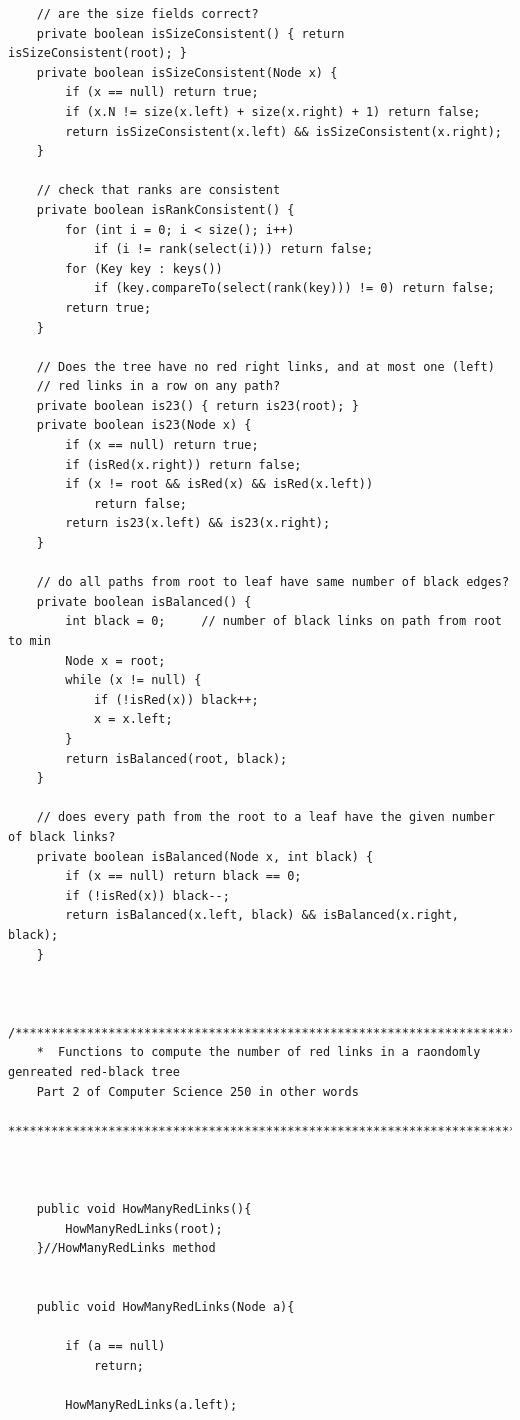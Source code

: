 \documentclass{article}
\begin{document}
\begin{lstlisting}
    // are the size fields correct?
    private boolean isSizeConsistent() { return isSizeConsistent(root); }
    private boolean isSizeConsistent(Node x) {
        if (x == null) return true;
        if (x.N != size(x.left) + size(x.right) + 1) return false;
        return isSizeConsistent(x.left) && isSizeConsistent(x.right);
    } 

    // check that ranks are consistent
    private boolean isRankConsistent() {
        for (int i = 0; i < size(); i++)
            if (i != rank(select(i))) return false;
        for (Key key : keys())
            if (key.compareTo(select(rank(key))) != 0) return false;
        return true;
    }

    // Does the tree have no red right links, and at most one (left)
    // red links in a row on any path?
    private boolean is23() { return is23(root); }
    private boolean is23(Node x) {
        if (x == null) return true;
        if (isRed(x.right)) return false;
        if (x != root && isRed(x) && isRed(x.left))
            return false;
        return is23(x.left) && is23(x.right);
    } 

    // do all paths from root to leaf have same number of black edges?
    private boolean isBalanced() { 
        int black = 0;     // number of black links on path from root to min
        Node x = root;
        while (x != null) {
            if (!isRed(x)) black++;
            x = x.left;
        }
        return isBalanced(root, black);
    }

    // does every path from the root to a leaf have the given number of black links?
    private boolean isBalanced(Node x, int black) {
        if (x == null) return black == 0;
        if (!isRed(x)) black--;
        return isBalanced(x.left, black) && isBalanced(x.right, black);
    } 


   /*****************************************************************************
    *  Functions to compute the number of red links in a raondomly genreated red-black tree
    Part 2 of Computer Science 250 in other words
    *****************************************************************************/



    public void HowManyRedLinks(){
    	HowManyRedLinks(root);
    }//HowManyRedLinks method


   	public void HowManyRedLinks(Node a){

   		if (a == null)
   			return;

   		HowManyRedLinks(a.left);



\end{lstlisting}
\end{document}
